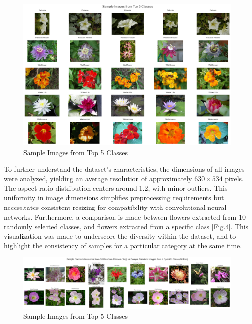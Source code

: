 \begin{figure}[h!]
    \centering
    \includegraphics[width=\linewidth]{Images/Sample Images from Top 5 Classes}
    \caption{Sample Images from Top 5 Classes}
\end{figure}

To further understand the dataset's characteristics, the dimensions of all images were analyzed, yielding an average
resolution of approximately \(630 \times 534\) pixels. The aspect ratio distribution centers around 1.2, with minor
outliers. This uniformity in image dimensions simplifies preprocessing requirements but necessitates consistent
resizing for compatibility with convolutional neural networks. Furthermore, a comparison is made between flowers
extracted from 10 randomly selected classes, and flowers extracted from a specific class [Fig.4]. This visualization was made
to underscore the diversity within the dataset, and to highlight the consistency of samples for a particular category at the same time.

\begin{figure}[h!]
    \centering
    \includegraphics[width=\linewidth]{Images/Sample Random Instances from 10 Random Classes (Top) vs Sample Random Images from a Specific Class (Bottom)}
    \caption{Sample Images from Top 5 Classes}
\end{figure}


